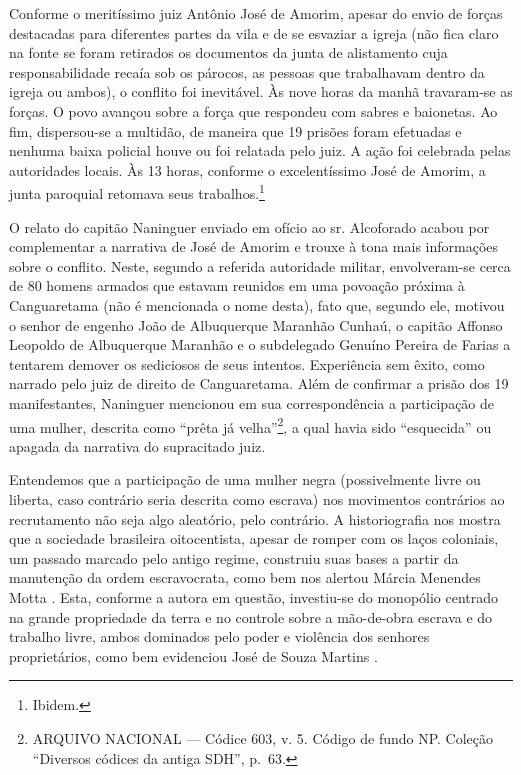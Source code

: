 \begin{refsection}
Conforme o meritíssimo juiz Antônio José de Amorim, apesar do envio de forças destacadas para diferentes partes da vila e de se esvaziar a igreja (não fica claro na fonte se foram retirados os documentos da junta de alistamento cuja responsabilidade recaía sob os párocos, as pessoas que trabalhavam dentro da igreja ou ambos), o conflito foi inevitável. Às nove horas da manhã travaram-se as forças. O povo avançou sobre a força que respondeu com sabres e baionetas. Ao fim, dispersou-se a multidão, de maneira que 19 prisões foram efetuadas e nenhuma baixa policial houve ou foi relatada pelo juiz. A ação foi celebrada pelas autoridades locais. Às 13 horas, conforme o excelentíssimo José de Amorim, a junta paroquial retomava seus trabalhos.\footnote{Ibidem.}

O relato do capitão Naninguer enviado em ofício ao sr. Alcoforado acabou por complementar a narrativa de José de Amorim e trouxe à tona mais informações sobre o conflito. Neste, segundo a referida autoridade militar, envolveram-se cerca de 80 homens armados que estavam reunidos em uma povoação próxima à Canguaretama (não é mencionada o nome desta), fato que, segundo ele, motivou o senhor de engenho João de Albuquerque Maranhão Cunhaú, o capitão Affonso Leopoldo de Albuquerque Maranhão e o subdelegado Genuíno Pereira de Farias a tentarem demover os sediciosos de seus intentos. Experiência sem êxito, como narrado pelo juiz de direito de Canguaretama. Além de confirmar a prisão dos 19 manifestantes, Naninguer mencionou em sua correspondência a participação de uma mulher, descrita como “prêta já velha”\footnote{ARQUIVO NACIONAL --- Códice 603, v. 5. Código de fundo NP. Coleção “Diversos códices da antiga SDH”, p.~63.}, a qual havia sido “esquecida” ou apagada da narrativa do supracitado juiz.  

Entendemos que a participação de uma mulher negra (possivelmente livre ou liberta, caso contrário seria descrita como escrava) nos movimentos contrários ao recrutamento não seja algo aleatório, pelo contrário. A historiografia nos mostra que a sociedade brasileira oitocentista, apesar de romper com os laços coloniais, um passado marcado pelo antigo regime, construiu suas bases a partir da manutenção da ordem escravocrata, como bem nos alertou Márcia Menendes Motta \citeyear{Motta1998NasFronteiras}. Esta, conforme a autora em questão, investiu-se do monopólio centrado na grande propriedade da terra e no controle sobre a mão-de-obra escrava e do trabalho livre, ambos dominados pelo poder e violência dos senhores proprietários, como bem evidenciou José de Souza Martins \citeyear{Martins2010}.


\end{refsection}
